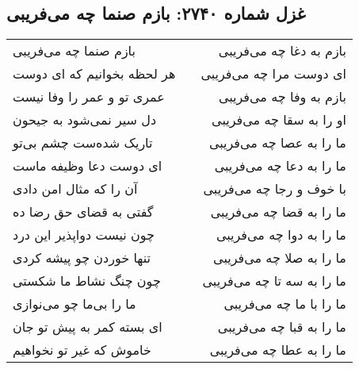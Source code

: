 \begin{center}
\section*{غزل شماره ۲۷۴۰: بازم صنما چه می‌فریبی}
\label{sec:2740}
\begin{longtable}{l p{0.5cm} r}
بازم صنما چه می‌فریبی
&&
بازم به دغا چه می‌فریبی
\\
هر لحظه بخوانیم که ای دوست
&&
ای دوست مرا چه می‌فریبی
\\
عمری تو و عمر را وفا نیست
&&
بازم به وفا چه می‌فریبی
\\
دل سیر نمی‌شود به جیحون
&&
او را به سقا چه می‌فریبی
\\
تاریک شده‌ست چشم بی‌تو
&&
ما را به عصا چه می‌فریبی
\\
ای دوست دعا وظیفه ماست
&&
ما را به دعا چه می‌فریبی
\\
آن را که مثال امن دادی
&&
با خوف و رجا چه می‌فریبی
\\
گفتی به قضای حق رضا ده
&&
ما را به قضا چه می‌فریبی
\\
چون نیست دواپذیر این درد
&&
ما را به دوا چه می‌فریبی
\\
تنها خوردن چو پیشه کردی
&&
ما را به صلا چه می‌فریبی
\\
چون چنگ نشاط ما شکستی
&&
ما را به سه تا چه می‌فریبی
\\
ما را بی‌ما چو می‌نوازی
&&
ما را با ما چه می‌فریبی
\\
ای بسته کمر به پیش تو جان
&&
ما را به قبا چه می‌فریبی
\\
خاموش که غیر تو نخواهیم
&&
ما را به عطا چه می‌فریبی
\\
\end{longtable}
\end{center}
